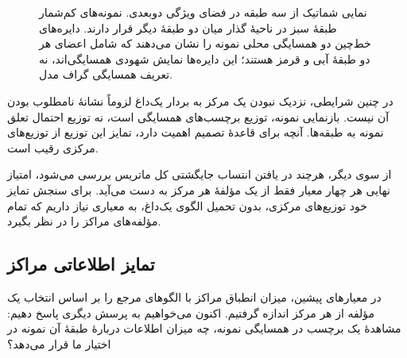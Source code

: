 \begin{figure}[!htbp]
\begin{LTR}
{%
}
\end{LTR}
\caption{نمایی شماتیک از سه طبقه در فضای ویژگی دوبعدی.
نمونه‌های کم‌شمار طبقهٔ سبز در ناحیهٔ گذار میان
دو طبقهٔ دیگر قرار دارند. دایره‌های خط‌چین دو
همسایگی محلی نمونه را نشان می‌دهند که شامل
اعضای هر دو طبقهٔ آبی و قرمز هستند؛ این دایره‌ها
نمایش شهودی همسایگی‌اند، نه تعریف همسایگی گراف مدل.}
\label{cmp:fig:ch3-mixed-neighborhood-classes}
\end{figure}

در چنین شرایطی، نزدیک نبودن یک مرکز به بردار
یک‌داغ لزوماً نشانهٔ نامطلوب بودن آن نیست.
بازنمایی نمونه، توزیع برچسب‌های همسایگی است،
نه توزیع احتمال تعلق نمونه به طبقه‌ها. آنچه
برای قاعدهٔ تصمیم اهمیت دارد، تمایز این توزیع
از توزیع‌های مرکزی رقیب است.

از سوی دیگر، هرچند در یافتن انتساب جایگشتی
کل ماتریس بررسی می‌شود، امتیاز نهایی هر چهار
معیار فقط از یک مؤلفهٔ هر مرکز به دست می‌آید.
برای سنجش تمایز خود توزیع‌های مرکزی، بدون
تحمیل الگوی یک‌داغ، به معیاری نیاز داریم که
تمام مؤلفه‌های مراکز را در نظر بگیرد.

\subsection{تمایز اطلاعاتی مراکز}
\label{cmp:subsec:ch3-information-separation}

در معیارهای پیشین، میزان انطباق مراکز با الگوهای
مرجع را بر اساس انتخاب یک مؤلفه از هر مرکز
اندازه گرفتیم. اکنون می‌خواهیم به پرسش دیگری
پاسخ دهیم: مشاهدهٔ یک برچسب در همسایگی نمونه،
چه میزان اطلاعات دربارهٔ طبقهٔ آن نمونه در اختیار
ما قرار می‌دهد؟

